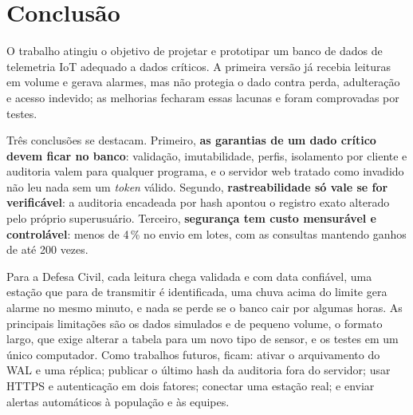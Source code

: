 \chapter{Conclusão}\label{cap:conclusao}

O trabalho atingiu o objetivo de projetar e prototipar um banco de dados de telemetria IoT adequado a dados críticos. A primeira versão já recebia leituras em volume e gerava alarmes, mas não protegia o dado contra perda, adulteração e acesso indevido; as melhorias fecharam essas lacunas e foram comprovadas por testes.

Três conclusões se destacam. Primeiro, \textbf{as garantias de um dado crítico devem ficar no banco}: validação, imutabilidade, perfis, isolamento por cliente e auditoria valem para qualquer programa, e o servidor web tratado como invadido não leu nada sem um \textit{token} válido. Segundo, \textbf{rastreabilidade só vale se for verificável}: a auditoria encadeada por hash apontou o registro exato alterado pelo próprio superusuário. Terceiro, \textbf{segurança tem custo mensurável e controlável}: menos de 4\,\% no envio em lotes, com as consultas mantendo ganhos de até 200 vezes.

Para a Defesa Civil, cada leitura chega validada e com data confiável, uma estação que para de transmitir é identificada, uma chuva acima do limite gera alarme no mesmo minuto, e nada se perde se o banco cair por algumas horas. As principais limitações são os dados simulados e de pequeno volume, o formato largo, que exige alterar a tabela para um novo tipo de sensor, e os testes em um único computador. Como trabalhos futuros, ficam: ativar o arquivamento do WAL e uma réplica; publicar o último hash da auditoria fora do servidor; usar HTTPS e autenticação em dois fatores; conectar uma estação real; e enviar alertas automáticos à população e às equipes.
